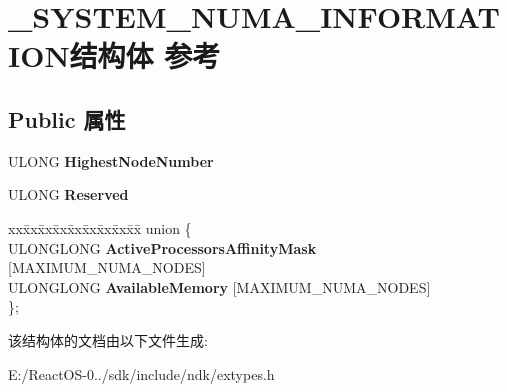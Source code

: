 \hypertarget{struct___s_y_s_t_e_m___n_u_m_a___i_n_f_o_r_m_a_t_i_o_n}{}\section{\+\_\+\+S\+Y\+S\+T\+E\+M\+\_\+\+N\+U\+M\+A\+\_\+\+I\+N\+F\+O\+R\+M\+A\+T\+I\+O\+N结构体 参考}
\label{struct___s_y_s_t_e_m___n_u_m_a___i_n_f_o_r_m_a_t_i_o_n}
\subsection*{Public 属性}
\begin{DoxyCompactItemize}
\item 
\mbox{\label{struct___s_y_s_t_e_m___n_u_m_a___i_n_f_o_r_m_a_t_i_o_n_af35f04b57a01075a65399b05146326bb}} 
U\+L\+O\+NG {\bfseries Highest\+Node\+Number}
\item 
\mbox{\label{struct___s_y_s_t_e_m___n_u_m_a___i_n_f_o_r_m_a_t_i_o_n_aaf5eeaa408e3d0e7ca4a1bdf5240d8e8}} 
U\+L\+O\+NG {\bfseries Reserved}
\item 
\mbox{\label{struct___s_y_s_t_e_m___n_u_m_a___i_n_f_o_r_m_a_t_i_o_n_afd9c60399a551a407e347403851caf75}} 
\begin{tabbing}
xx\=xx\=xx\=xx\=xx\=xx\=xx\=xx\=xx\=\kill
union \{\\
\>ULONGLONG {\bfseries ActiveProcessorsAffinityMask} \mbox{[}MAXIMUM\_NUMA\_NODES\mbox{]}\\
\>ULONGLONG {\bfseries AvailableMemory} \mbox{[}MAXIMUM\_NUMA\_NODES\mbox{]}\\
\}; \\

\end{tabbing}\end{DoxyCompactItemize}


该结构体的文档由以下文件生成\+:\begin{DoxyCompactItemize}
\item 
E\+:/\+React\+O\+S-\/0../sdk/include/ndk/extypes.\+h\end{DoxyCompactItemize}
